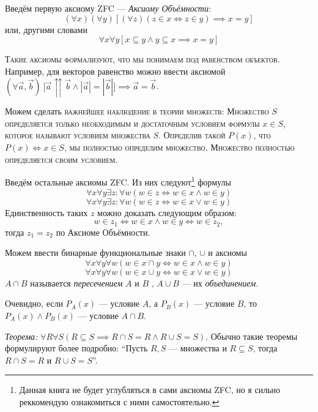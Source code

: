 Введём первую аксиому ZFC --- {\it Аксиому Объёмности}:
\begin{equation}\label{eq:ax_ext_1}
  (\forall x)(\forall y)[(\forall z)(z\in x\iff z\in y)\implies x=y]
\end{equation}
или, другими словами
\begin{equation}\label{eq:ax_ext_2}
  \forall x\forall y[x\subseteq y\land y\subseteq x\implies x=y]
\end{equation}

\textsc{Такие аксиомы формализуют, что мы понимаем под равенством объектов.}
Например, для векторов равенство можно ввести аксиомой
$(\forall \vec{a},\vec{b})~
  \big[\vec{a}\upuparrows\vec{b}\land|\vec{a}|=|\vec{b}|\big]
  \implies \vec{a}=\vec{b}$.

Можем сделать \textsc{важнейшее наблюдение в теории множеств: Множество $S$
  определяется только необходимым и достаточным условием формулы $x\in S$,
  которое называют условием множества $S$.
  Определив такой $P(x)$, что $P(x)\iff x\in S$, мы полностью определим множество.
  Множество полностью определяется своим условием.}

Введём остальные аксиомы ZFC. Из них следуют\footnote{
  Данная книга не будет углубляться в сами аксиомы ZFC, но я сильно реккомендую
  ознакомиться с ними самостоятельно.}
формулы
\[
  \forall x\forall y\exists z:\forall w(w\in z\iff w\in x\land w\in y)
\]
\[
  \forall x\forall y\exists z:\forall w(w\in z\iff w\in x\lor w\in y)
\]
Единственность таких $z$ можно доказать следующим образом:
\[
  w\in z_1\iff w\in x\land w\in y\iff w\in z_2,
\]
тогда $z_1=z_2$ по Аксиоме Объёмности.

Можем ввести бинарные функциональные знаки $\cap$, $\cup$ и аксиомы
\[
  \forall x\forall y\forall w(w\in x\cap y\iff w\in x\land w\in y)
\]
\[
  \forall x\forall y\forall w(w\in x\cup y\iff w\in x\lor w\in y)
\]
$A\cap B$ называется {\it пересечением} $A$ и $B$
,
$A\cup B$ --- их {\it объединением}.

Очевидно, если $P_{A}(x)$ --- условие $A$, а $P_{B}(x)$ --- условие $B$,
то $P_{A}(x)\land P_{B}(x)$ --- условие $A\cap B$.

\vspace{1em}
{\it Теорема:} ${\forall R\forall S(R\subseteq S\implies R\cap S=R\land R\cup S=S)}$.
Обычно такие теоремы формулируют более подробно:
``Пусть $R,S$ --- множества и $R\subseteq S$, тогда $R\cap S=R$ и $R\cup S=S$''.

